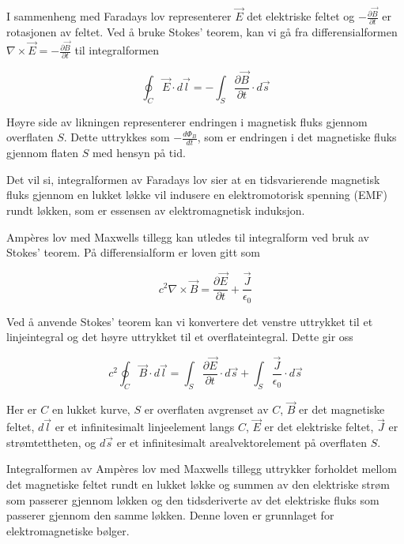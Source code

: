 I sammenheng med Faradays lov representerer $\vec{E}$ det elektriske feltet og $-\frac{\partial \vec{B}}{\partial t}$ er rotasjonen av feltet. Ved å bruke Stokes' teorem, kan vi gå fra differensialformen $\nabla \times \vec{E} = -\frac{\partial \vec{B}}{\partial t}$ til integralformen

\begin{equation*}
\oint_C \vec{E} \cdot d\vec{l} = -\int_S \frac{\partial \vec{B}}{\partial t} \cdot d\vec{s}
\end{equation*}

Høyre side av likningen representerer endringen i magnetisk fluks gjennom overflaten $S$. Dette uttrykkes som $-\frac{d\Phi_B}{dt}$, som er endringen i det magnetiske fluks gjennom flaten $S$ med hensyn på tid.

Det vil si, integralformen av Faradays lov sier at en tidsvarierende magnetisk fluks gjennom en lukket løkke vil indusere en elektromotorisk spenning (EMF) rundt løkken, som er essensen av elektromagnetisk induksjon.

Ampères lov med Maxwells tillegg kan utledes til integralform ved bruk av Stokes' teorem. På differensialform er loven gitt som

\begin{equation*}
c^2\nabla \times \vec{B} =\frac{\partial \vec{E}}{\partial t} + \frac{\vec{J}}{\epsilon_0}
\end{equation*}

Ved å anvende Stokes' teorem kan vi konvertere det venstre uttrykket til et linjeintegral og det høyre uttrykket til et overflateintegral. Dette gir oss

\begin{equation*}
c^2 \oint_C \vec{B} \cdot d\vec{l} = \int_S \frac{\partial \vec{E}}{\partial t} \cdot d\vec{s} + \int_S \frac{\vec{J}}{\epsilon_0} \cdot d\vec{s}
\end{equation*}

Her er $C$ en lukket kurve, $S$ er overflaten avgrenset av $C$, $\vec{B}$ er det magnetiske feltet, $d\vec{l}$ er et infinitesimalt linjeelement langs $C$, $\vec{E}$ er det elektriske feltet, $\vec{J}$ er strømtettheten, og $d\vec{s}$ er et infinitesimalt arealvektorelement på overflaten $S$.

Integralformen av Ampères lov med Maxwells tillegg uttrykker forholdet mellom det magnetiske feltet rundt en lukket løkke og summen av den elektriske strøm som passerer gjennom løkken og den tidsderiverte av det elektriske fluks som passerer gjennom den samme løkken. Denne loven er grunnlaget for elektromagnetiske bølger.

